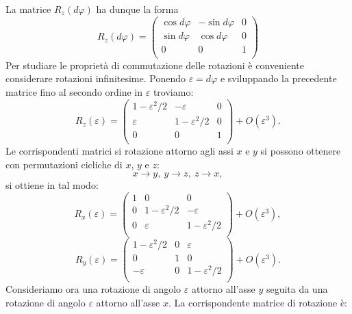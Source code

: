 La matrice $R_z (d\varphi)$ ha dunque la forma
\begin{equation}
R_z (d\varphi)=
\begin{pmatrix}
\cos d\varphi & -\sin d\varphi & 0\\
\sin d\varphi & \cos d\varphi & 0 \\
0 & 0 & 1 \\
\end{pmatrix}
\end{equation}
Per studiare le proprietà di commutazione delle rotazioni è conveniente considerare rotazioni infinitesime. Ponendo $\varepsilon =d\varphi$ e sviluppando la precedente matrice fino al secondo ordine in $\varepsilon$ troviamo:
\begin{equation}
R_z (\varepsilon)=
\begin{pmatrix}
1-\varepsilon ^2 /2 & -\varepsilon & 0\\
\varepsilon & 1-\varepsilon ^2/2 & 0 \\
0 & 0 & 1 \\
\end{pmatrix}
+ O(\varepsilon ^3).
\end{equation}
Le corrispondenti matrici si rotazione attorno agli assi $x$ e $y$ si possono ottenere con permutazioni cicliche di $x$, $y$ e $z$:
\begin{equation}
x\rightarrow y,\ y\rightarrow z,\ z\rightarrow x,
\end{equation}
si ottiene in tal modo:
\begin{equation}
R_x (\varepsilon)=
\begin{pmatrix}
1 & 0 & 0\\
0 & 1-\varepsilon ^2/2 & -\varepsilon \\
0 & \varepsilon & 1-\varepsilon ^2/2 \\
\end{pmatrix}
+ O(\varepsilon ^3),
\end{equation}
\begin{equation}
R_y (\varepsilon)=
\begin{pmatrix}
1-\varepsilon ^2/2 & 0 & \varepsilon\\
0 & 1 &0 \\
- \varepsilon & 0 & 1-\varepsilon ^2/2 \\
\end{pmatrix}
+ O(\varepsilon ^3).
\end{equation}
Consideriamo ora una rotazione di angolo $\varepsilon$ attorno all'asse $y$ seguita da una rotazione di angolo $\varepsilon$ attorno all'asse $x$. La corrispondente matrice di rotazione è:
